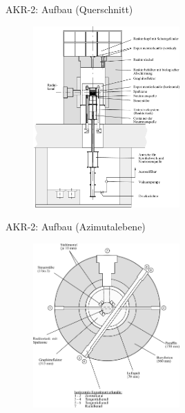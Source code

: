 \documentclass[10pt]{beamer}
\begin{document}
		\begin{frame}{AKR-2: Aufbau (Querschnitt)}
			\begin{figure}[ht]
				\centering
				\includegraphics[width=0.5\textwidth]{pic/Vertikalquerschnitt_Reaktor.pdf}\\
			\end{figure}	
		\end{frame}
		
		\begin{frame}{AKR-2: Aufbau (Azimutalebene)}
				\begin{figure}[ht]
					\centering
					\includegraphics[width=0.5\textwidth]{pic/Horizontalquerschnitt_Reaktor}\\
				\end{figure}	
		\end{frame}
		
\end{document}
